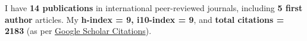 \hfill
\par
I have \textbf{14 publications} in international peer-reviewed journals, including \textbf{5 first author} articles. My \textbf{h-index = 9, i10-index = 9}, and \textbf{total citations = 2183} (as per \href{https://scholar.google.com/citations?hl=en&user=6-7FYjIAAAAJ&authuser=2}{Google Scholar Citations}).

\nocite{*}


\printbibliography[heading={subbibliography},title={Published},type=article]

\printbibliography[heading={subbibliography},title={Submitted/In Review},type=misc]


